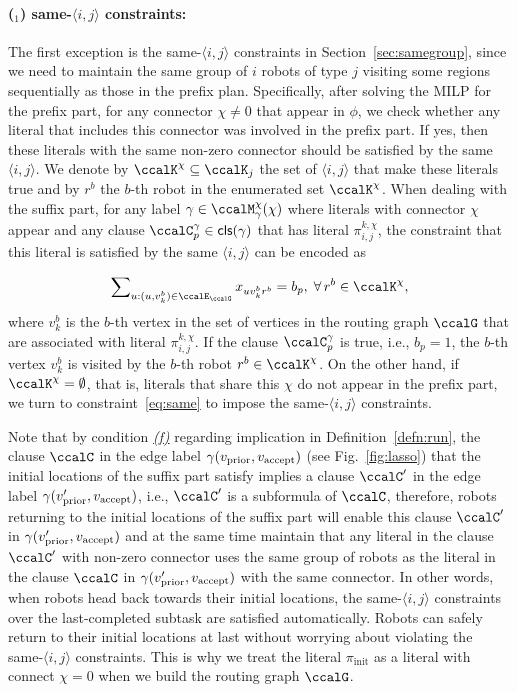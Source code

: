 \documentclass[Afour,sageh,times]{sagej}
\newcounter{mycounter}
\newcommand{\clause}[1]{\mathsf{cls}(#1)}
\newcommand{\vertex}[1]{v_{\textup{#1}}}
\newcommand{\ag}[2]{\langle#1,#2\rangle}
\renewcommand{\ap}[3]{\mathcal{\pi}_{{#1},{#2}}^{#3}}
\newcommand{\aap}[4]{\mathcal{\pi}_{{#1},{#2}}^{#3,#4}}
\begin{document}
{{{\paragraph{($_1$) same-$\ag{i}{j}$ constraints:} The first exception is the same-$\ag{i}{j}$ constraints in Section~\ref{sec:samegroup}, since we need to maintain the same group of $i$ robots of type $j$ visiting some regions sequentially as those in the prefix plan. Specifically, after solving the MILP for the prefix part, for any connector $\chi\not=0$ that appear in $\phi$, we check whether any literal that includes this connector was involved in the prefix part. If yes, then these literals with the same non-zero connector should be satisfied by the same $\ag{i}{j}$. We denote by $\ccalK^\chi \subseteq \ccalK_j$ the set of $\ag{i}{j}$ that make these literals true and  by  $r^b$ the $b$-th robot in the enumerated set $\ccalK^\chi$. When dealing with the suffix part, for any label $\gamma \in\ccalM_\mathsf{\gamma}^\chi(\chi)$ where literals with connector $\chi$ appear and any clause $\ccalC_p^\gamma \in \clause{\gamma}$ that has  literal $\aap{i}{j}{k}{\chi}$, the constraint that this literal is satisfied by the same $\ag{i}{j}$  can be encoded as}
\begingroup\makeatletter{}\check@mathfonts
\def\maketag@@@#1{\hbox{\m@th\normalsize\normalfont#1}}%
\begin{align}\label{eq:same_suffix}
    \sum\nolimits_{u:(u, v_k^b) \in \ccalE_\ccalG} x_{u v_k^b r^b} =  b_p, \;\forall\, r^b \in \ccalK^\chi,
  \end{align}
\endgroup
where $v_k^b$ is the $b$-th vertex in the set of vertices in the routing graph $\ccalG$  that are associated with literal $\ap{i}{j}{k,\chi}$. If the clause $\ccalC_p^\gamma$ is true, i.e.,  $b_p=1$, the $b$-th vertex $v_k^b$ is visited by the $b$-th robot $r^b \in \ccalK^\chi$. On the other hand, if $\ccalK^\chi = \emptyset$, that is, literals that share this $\chi$ do not appear in the prefix part, we turn to constraint~\eqref{eq:same} to impose the same-$\ag{i}{j}$ constraints.

Note that by condition \hyperref[cond:f]{\it (f)} regarding implication in Definition~\ref{defn:run}, the clause $\ccalC$ in the edge label $\gamma(\vertex{prior}, \vertex{accept})$ (see Fig.~\ref{fig:lasso}) that the initial locations of the suffix part satisfy implies a clause $\ccalC'$ in the edge label $\gamma(\vertex{prior}', \vertex{accept})$, i.e., $\ccalC'$ is a subformula of $\ccalC$,  therefore, robots returning to the initial locations of the suffix part will enable this clause $\ccalC'$ in $\gamma(\vertex{prior}', \vertex{accept})$ and at the same time maintain that any literal in the clause $\ccalC'$ with non-zero connector uses the same group of robots as the literal in the clause $\ccalC$ in $\gamma(\vertex{prior}', \vertex{accept})$ with the same connector.  In other words, when robots head back towards their initial locations, the same-$\ag{i}{j}$ constraints over the last-completed subtask are satisfied automatically. Robots can safely return to their initial locations at last without worrying about violating the same-$\ag{i}{j}$ constraints. This is why we treat the literal $\pi_{\text{init}}$ as a literal with connect $\chi=0$ when we build the routing graph $\ccalG$.

}}
\end{document}
